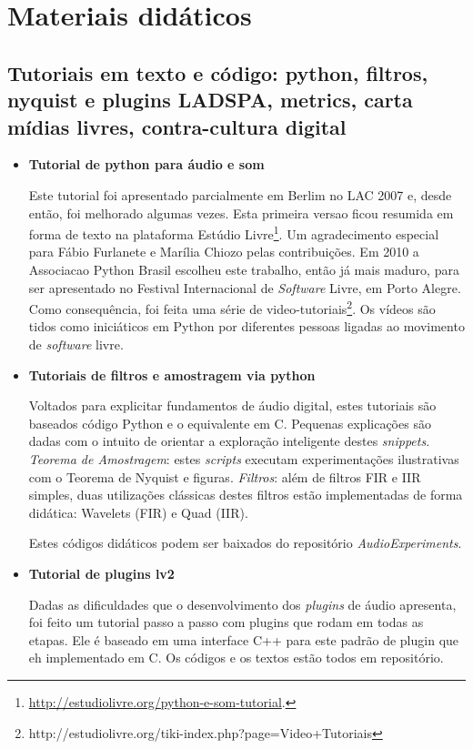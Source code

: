 \section{Materiais didáticos}

  \subsection{ Tutoriais em texto e código: python, filtros, nyquist e plugins LADSPA, metrics, carta mídias livres, contra-cultura digital }\label{subsec:tuts}

\begin{itemize}
    \item {\bf Tutorial de python para áudio e som}

Este tutorial foi apresentado parcialmente em Berlim no LAC 2007 e, desde então, foi melhorado algumas vezes. Esta
primeira versao ficou resumida em forma de texto na plataforma
Estúdio Livre\footnote{\url{http://estudiolivre.org/python-e-som-tutorial}.}.
Um agradecimento especial para Fábio Furlanete e Marília Chiozo pelas contribuições.
Em 2010
a Associacao Python Brasil escolheu este trabalho, então já mais maduro, para ser apresentado no
Festival Internacional de \emph{Software} Livre, em Porto Alegre. Como consequência, 
foi feita uma série de video-tutoriais\footnote{http://estudiolivre.org/tiki-index.php?page=Video+Tutoriais}.
Os vídeos são tidos como iniciáticos em Python por diferentes pessoas ligadas ao movimento de \emph{software} livre.

    \item {\bf Tutoriais de filtros e amostragem via python }

Voltados para explicitar fundamentos de áudio digital, estes tutoriais
são baseados código Python e o equivalente em C. Pequenas explicações são
dadas com o intuito de orientar a exploração inteligente destes \emph{snippets}.
\emph{Teorema de Amostragem}: estes \emph{scripts} executam experimentações ilustrativas com
o Teorema de Nyquist e figuras.
\emph{Filtros}: além de filtros FIR e IIR simples,
duas utilizações clássicas destes filtros estão implementadas
de forma didática: Wavelets (FIR) e Quad (IIR).

Estes códigos didáticos podem ser baixados do repositório \emph{AudioExperiments}.

    \item {\bf Tutorial de plugins lv2}

Dadas as dificuldades que o desenvolvimento dos \emph{plugins} de áudio apresenta,
foi feito um tutorial passo a passo com plugins que rodam em todas as etapas.
Ele é baseado em uma interface C++ para este padrão de plugin que eh implementado
em C. Os códigos e os textos estão todos em repositório.


\end{itemize}
